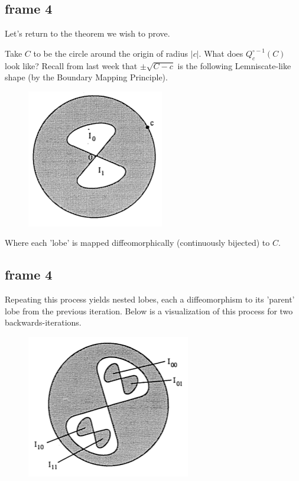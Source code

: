 \documentclass[xcolor=x11names,compress]{beamer}
\renewcommand{\(}{\begin{columns}}
\renewcommand{\)}{\end{columns}}
\newcommand{\<}[1]{\begin{column}{#1}}
\renewcommand{\>}{\end{column}}
\begin{document}
\subsection{frame 4}
\begin{frame}

Let's return to the theorem we wish to prove. 

\vspace{.4cm}
\pause


Take $C$ to be the circle around the origin of radius $|c|$. What does $Q^{\circ -1}_c(C)$ look like? Recall from last week that $\pm \sqrt{C - c}$ is the following Lemniscate-like shape (by the Boundary Mapping Principle).


\begin{figure}
\includegraphics[scale=.4]{lobes1.png}
\end{figure}



Where each 'lobe' is mapped diffeomorphically (continuously bijected) to $C$.

\end{frame}


\subsection{frame 4}
\begin{frame}

Repeating this process yields nested lobes, each a diffeomorphism to its 'parent' lobe from the previous iteration. Below is a visualization of this process for two backwards-iterations.

\pause

\begin{figure}
\includegraphics[scale=.4]{lobes2.png}
\end{figure}

\end{frame}
\end{document}
